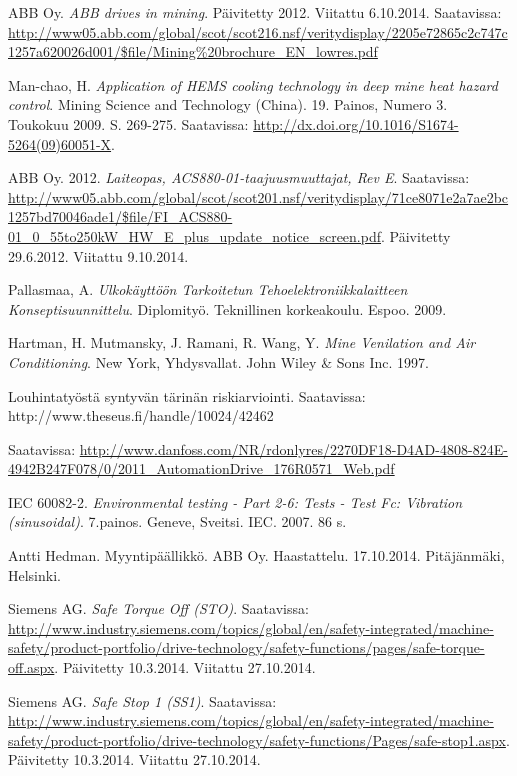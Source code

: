 \documentclass[finnish,12pt,a4paper,pdftex,elec,utf8]{aaltothesis}
\begin{document}
\begin{thebibliography}{99}
ABB Oy. \textit{ABB drives in mining}. Päivitetty 2012. Viitattu 6.10.2014. Saatavissa: \url{http://www05.abb.com/global/scot/scot216.nsf/veritydisplay/2205e72865c2c747c1257a620026d001/$file/Mining%20brochure_EN_lowres.pdf}

Man-chao, H. \textit{Application of HEMS cooling technology in deep mine heat hazard control}. Mining Science and Technology (China). 19. Painos, Numero 3. Toukokuu 2009. S. 269-275. Saatavissa: \url{http://dx.doi.org/10.1016/S1674-5264(09)60051-X}.

ABB Oy. 2012. \textit{Laiteopas, ACS880-01-taajuusmuuttajat, Rev E}. Saatavissa: \url{http://www05.abb.com/global/scot/scot201.nsf/veritydisplay/71ce8071e2a7ae2bc1257bd70046ade1/$file/FI_ACS880-01_0_55to250kW_HW_E_plus_update_notice_screen.pdf}. Päivitetty 29.6.2012. Viitattu 9.10.2014.

Pallasmaa, A. \textit{Ulkokäyttöön Tarkoitetun Tehoelektroniikkalaitteen Konseptisuunnittelu}. Diplomityö. Teknillinen korkeakoulu. Espoo. 2009.

Hartman, H. Mutmansky, J. Ramani, R. Wang, Y. \textit{Mine Venilation and Air Conditioning}. New York, Yhdysvallat. John Wiley \& Sons Inc. 1997.

Louhintatyöstä syntyvän tärinän riskiarviointi. Saatavissa: http://www.theseus.fi/handle/10024/42462

 Saatavissa: \url{http://www.danfoss.com/NR/rdonlyres/2270DF18-D4AD-4808-824E-4942B247F078/0/2011_AutomationDrive_176R0571_Web.pdf}

IEC 60082-2. \textit{Environmental testing - Part 2-6: Tests - Test Fc: Vibration (sinusoidal)}. 7.painos. Geneve, Sveitsi. IEC. 2007. 86 s.

Antti Hedman. Myyntipäällikkö. ABB Oy. Haastattelu. 17.10.2014. Pitäjänmäki, Helsinki.

Siemens AG. \textit{Safe Torque Off (STO)}. Saatavissa: \url{http://www.industry.siemens.com/topics/global/en/safety-integrated/machine-safety/product-portfolio/drive-technology/safety-functions/pages/safe-torque-off.aspx}. Päivitetty 10.3.2014. Viitattu 27.10.2014.

Siemens AG. \textit{Safe Stop 1 (SS1)}. Saatavissa: \url{http://www.industry.siemens.com/topics/global/en/safety-integrated/machine-safety/product-portfolio/drive-technology/safety-functions/Pages/safe-stop1.aspx}. Päivitetty 10.3.2014. Viitattu 27.10.2014.


\end{thebibliography}
\end{document}
